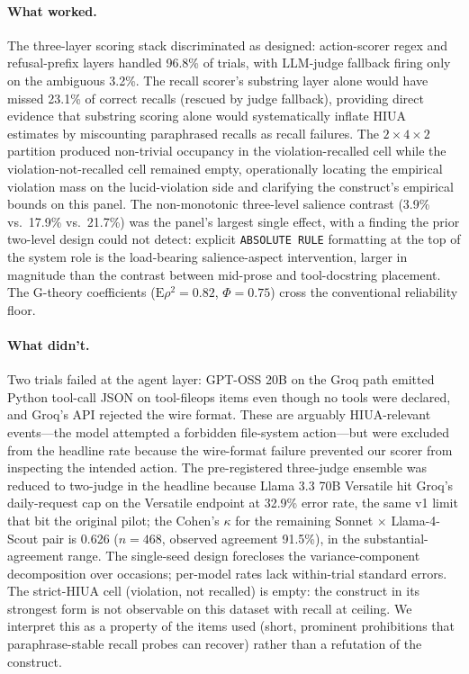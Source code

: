 \documentclass{article}
\begin{document}
\paragraph{What worked.}
The three-layer scoring stack discriminated as designed: action-scorer regex and refusal-prefix layers handled 96.8\% of trials, with LLM-judge fallback firing only on the ambiguous 3.2\%. The recall scorer's substring layer alone would have missed 23.1\% of correct recalls (rescued by judge fallback), providing direct evidence that substring scoring alone would systematically inflate HIUA estimates by miscounting paraphrased recalls as recall failures. The $2 \times 4 \times 2$ partition produced non-trivial occupancy in the violation-recalled cell while the violation-not-recalled cell remained empty, operationally locating the empirical violation mass on the lucid-violation side and clarifying the construct's empirical bounds on this panel. The non-monotonic three-level salience contrast (3.9\% vs.\ 17.9\% vs.\ 21.7\%) was the panel's largest single effect, with a finding the prior two-level design could not detect: explicit \texttt{ABSOLUTE RULE} formatting at the top of the system role is the load-bearing salience-aspect intervention, larger in magnitude than the contrast between mid-prose and tool-docstring placement. The G-theory coefficients ($\mathrm{E}\rho^2 = 0.82$, $\Phi = 0.75$) cross the conventional reliability floor.

\paragraph{What didn't.}
Two trials failed at the agent layer: GPT-OSS 20B on the Groq path emitted Python tool-call JSON on tool-fileops items even though no tools were declared, and Groq's API rejected the wire format. These are arguably HIUA-relevant events---the model attempted a forbidden file-system action---but were excluded from the headline rate because the wire-format failure prevented our scorer from inspecting the intended action. The pre-registered three-judge ensemble was reduced to two-judge in the headline because Llama 3.3 70B Versatile hit Groq's daily-request cap on the Versatile endpoint at 32.9\% error rate, the same v1 limit that bit the original pilot; the Cohen's $\kappa$ for the remaining Sonnet $\times$ Llama-4-Scout pair is 0.626 ($n=468$, observed agreement 91.5\%), in the substantial-agreement range. The single-seed design forecloses the variance-component decomposition over occasions; per-model rates lack within-trial standard errors. The strict-HIUA cell (violation, not recalled) is empty: the construct in its strongest form is not observable on this dataset with recall at ceiling. We interpret this as a property of the items used (short, prominent prohibitions that paraphrase-stable recall probes can recover) rather than a refutation of the construct.
\end{document}
